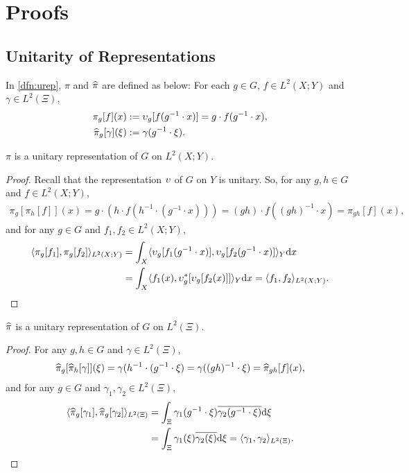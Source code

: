 \section{Proofs}

\subsection{Unitarity of Representations}
In \cref{dfn:urep}, $\pi$ and $\widehat{\pi}$ are defined as below:
For each $g \in G$, $f \in L^2(X;Y)$ and $\gamma \in L^2(\Xi)$,
\begin{align*}
    \pi_g[f](x)
    &:= \urep_g[ f(g^{-1} \cdot x) ]
    = g \cdot f(g^{-1} \cdot x), \\ %
    \pihat_g[\gamma](\xi)
    &:= \gamma(g^{-1} \cdot \xi). %
\end{align*}

\begin{lemma} \label{lem:pi.unitary}
    $\pi$ is a unitary representation of $G$ on $L^2(X;Y)$.
\end{lemma}
\begin{proof} %
Recall that the representation $\upsilon$ of $G$ on $Y$ is unitary. So, for any $g,h \in G$ and $f \in L^2(X;Y)$,
\begin{align*}
\pi_g[ \pi_h [f] ](x) = g \cdot (h \cdot f( h^{-1} \cdot (g^{-1} \cdot x) )) = (gh) \cdot f( (gh)^{-1} \cdot x ) = \pi_{gh}[f](x),
\end{align*}
and for any $g \in G$ and $f_1,f_2 \in L^2(X;Y)$,
\begin{align*}
\langle \pi_g[f_1], \pi_g[f_2] \rangle_{L^2(X;Y)}
&= \int_X \langle \upsilon_g[f_1(g^{-1}\cdot x)], \upsilon_g[f_2(g^{-1}\cdot x)]\rangle_{Y} \mathrm{d} x \\
&= \int_X \langle f_1(x), \upsilon_g^*[\upsilon_g[f_2(x)]]\rangle_{Y} \mathrm{d} x = \langle f_1, f_2\rangle_{L^2(X;Y)}.    \qedhere
\end{align*}
\end{proof}

\begin{lemma} \label{lem:pihat.unitary}
    $\widehat{\pi}$ is a unitary representation of $G$ on $L^2(\Xi)$.
\end{lemma}
\begin{proof} For any $g,h \in G$ and $\gamma \in L^2(\Xi)$,
\begin{align*}
\widehat{\pi}_g[ \widehat{\pi}_h [\gamma] ](\xi) = \gamma( h^{-1} \cdot (g^{-1} \cdot \xi) = \gamma( (gh)^{-1} \cdot \xi ) = \widehat{\pi}_{gh}[f](x),
\end{align*}
and for any $g \in G$ and $\gamma_1,\gamma_2 \in L^2(\Xi)$,
\begin{align*}
\langle \widehat{\pi}_g[\gamma_1], \widehat{\pi}_g[\gamma_2] \rangle_{L^2(\Xi)}
&= \int_{\Xi} \gamma_1(g^{-1}\cdot \xi) \overline{\gamma_2(g^{-1}\cdot \xi)} \mathrm{d} \xi\\
&= \int_{\Xi} \gamma_1(\xi) \overline{\gamma_2(\xi)} \mathrm{d} \xi = \langle\gamma_1, \gamma_2\rangle_{L^2(\Xi)}.    \qedhere
\end{align*}
\end{proof}


